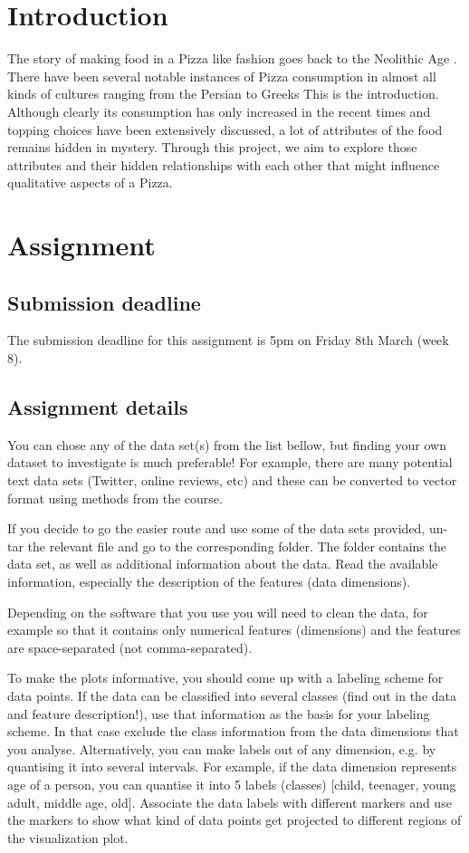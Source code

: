 \documentclass[preprint,12pt]{elsarticle}
\begin{document}
\section{Introduction}
\label{s:introduction}
The story of making food in a Pizza like fashion goes back to the Neolithic Age \cite{pizzaOrigins1991}. There have been several
notable instances of Pizza consumption in almost all kinds of cultures ranging from the Persian to Greeks \cite{Persian2014} \cite{Greek2000}
This is the introduction.  Although clearly its consumption has only increased in the recent times and topping choices have been extensively discussed,
a lot of attributes of the food remains hidden in mystery. Through this project, we aim to explore those attributes and their hidden relationships with
each other that might influence qualitative aspects of a Pizza.
\section{Assignment}
\label{s:assignment}
%
\subsection{Submission deadline}
\label{ss:deadline}
The submission deadline for this assignment is 5pm on Friday 8th March (week 8).
%
\subsection{Assignment details}
\label{ss:details}
You can chose any of the data set(s) from the list bellow, but finding your own dataset to investigate is much preferable!  For example, there are many potential text data sets (Twitter, online reviews, etc) and these can be converted to vector format using methods from the course.

If you decide to go the easier route and use some of the data sets provided, un-tar the relevant file and go to the corresponding folder.  The folder contains the data set, as well as additional information about the data. Read the available information, especially the description of the features (data dimensions).

Depending on the software that you use you will need to clean the data, for example so that it contains only numerical features (dimensions) and the features are space-separated (not comma-separated).

To make the plots informative, you should come up with a labeling scheme for data points.
If the data can be classified into several classes (find out in the data and feature description!), use that information as the basis for your labeling scheme. In that case exclude the class information from the data dimensions that you analyse.  Alternatively, you can make labels out of any dimension, e.g. by quantising it into several intervals. For example, if the data dimension represents age of a person, you can quantise it into 5 labels (classes) [child, teenager, young adult, middle age, old].  Associate the data labels with different markers and use the markers to show what kind of data points get projected to different regions of the visualization plot.
\end{document}
